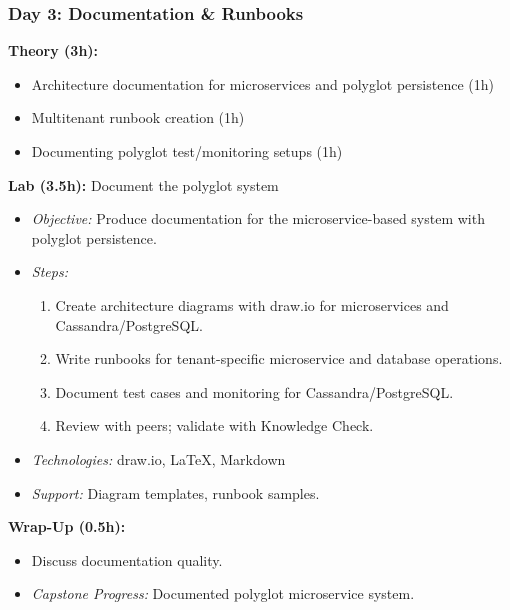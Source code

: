 \documentclass[11pt]{article}
\begin{document}
\subsubsection{Day 3: Documentation \& Runbooks}
\textbf{Theory (3h):}
\begin{itemize}
    \item Architecture documentation for microservices and polyglot persistence (1h)
    \item Multitenant runbook creation (1h)
    \item Documenting polyglot test/monitoring setups (1h)
\end{itemize}
\textbf{Lab (3.5h):} Document the polyglot system
\begin{itemize}
    \item \textit{Objective:} Produce documentation for the microservice-based system with polyglot persistence.
    \item \textit{Steps:}
        \begin{enumerate}
            \item Create architecture diagrams with draw.io for microservices and Cassandra/PostgreSQL.
            \item Write runbooks for tenant-specific microservice and database operations.
            \item Document test cases and monitoring for Cassandra/PostgreSQL.
            \item Review with peers; validate with Knowledge Check.
        \end{enumerate}
    \item \textit{Technologies:} draw.io, LaTeX, Markdown
    \item \textit{Support:} Diagram templates, runbook samples.
\end{itemize}
\textbf{Wrap-Up (0.5h):}
\begin{itemize}
    \item Discuss documentation quality.
    \item \textit{Capstone Progress:} Documented polyglot microservice system.
\end{itemize}
\end{document}
